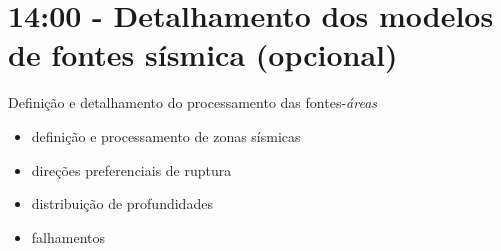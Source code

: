\documentclass[ucs,8pt]{beamer}
\begin{document}
\section{14:00 - Detalhamento dos modelos de fontes sísmica (opcional)}
	\begin{frame}{Definição e detalhamento do processamento das fontes-\emph{áreas}}
		\begin{itemize}
			\item definição e processamento de zonas sísmicas
			\item direções preferenciais de ruptura
			\item distribuição de profundidades
			\item falhamentos
		\end{itemize}
	\end{frame}
\end{document}
